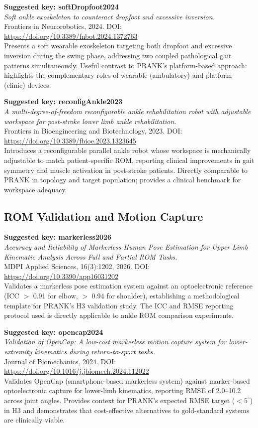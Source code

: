 \textbf{Suggested key: softDropfoot2024} \\
\textit{Soft ankle exoskeleton to counteract dropfoot and excessive inversion.} \\
Frontiers in Neurorobotics, 2024. DOI: \url{https://doi.org/10.3389/fnbot.2024.1372763} \\
Presents a soft wearable exoskeleton targeting both dropfoot and excessive inversion during the swing phase, addressing two coupled pathological gait patterns simultaneously. Useful contrast to PRANK's platform-based approach: highlights the complementary roles of wearable (ambulatory) and platform (clinic) devices.

\textbf{Suggested key: reconfigAnkle2023} \\
\textit{A multi-degree-of-freedom reconfigurable ankle rehabilitation robot with adjustable workspace for post-stroke lower limb ankle rehabilitation.} \\
Frontiers in Bioengineering and Biotechnology, 2023. DOI: \url{https://doi.org/10.3389/fbioe.2023.1323645} \\
Introduces a reconfigurable parallel ankle robot whose workspace is mechanically adjustable to match patient-specific ROM, reporting clinical improvements in gait symmetry and muscle activation in post-stroke patients. Directly comparable to PRANK in topology and target population; provides a clinical benchmark for workspace adequacy.

\subsection*{ROM Validation and Motion Capture}

\textbf{Suggested key: markerless2026} \\
\textit{Accuracy and Reliability of Markerless Human Pose Estimation for Upper Limb Kinematic Analysis Across Full and Partial ROM Tasks.} \\
MDPI Applied Sciences, 16(3):1202, 2026. DOI: \url{https://doi.org/10.3390/app16031202} \\
Validates a markerless pose estimation system against an optoelectronic reference (ICC $>$ 0.91 for elbow, $>$ 0.94 for shoulder), establishing a methodological template for PRANK's H3 validation study. The ICC and RMSE reporting protocol used is directly applicable to ankle ROM comparison experiments.

\textbf{Suggested key: opencap2024} \\
\textit{Validation of OpenCap: A low-cost markerless motion capture system for lower-extremity kinematics during return-to-sport tasks.} \\
Journal of Biomechanics, 2024. DOI: \url{https://doi.org/10.1016/j.jbiomech.2024.112022} \\
Validates OpenCap (smartphone-based markerless system) against marker-based optoelectronic capture for lower-limb kinematics, reporting RMSE of 2.0--10.2\textdegree{} across joint angles. Provides context for PRANK's expected RMSE target ($<5^{\circ}$) in H3 and demonstrates that cost-effective alternatives to gold-standard systems are clinically viable.
